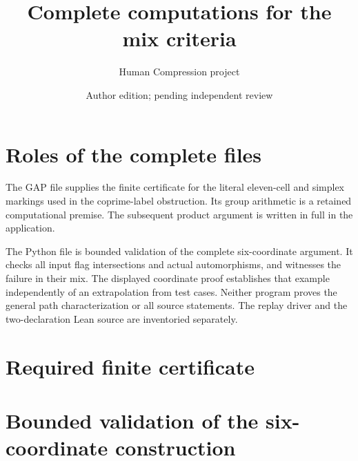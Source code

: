 \documentclass[a4paper,11pt]{article}
\title{Complete computations for the mix criteria}
\author{Human Compression project}\date{Author edition; pending independent review}
\begin{document}
\maketitle
\section*{Roles of the complete files}
The GAP file supplies the finite certificate for the literal eleven-cell and
simplex markings used in the coprime-label obstruction. Its group arithmetic is
a retained computational premise. The subsequent product argument is written
in full in the application.

The Python file is bounded validation of the complete six-coordinate argument.
It checks all input flag intersections and actual automorphisms, and witnesses
the failure in their mix. The displayed coordinate proof establishes that
example independently of an extrapolation from test cases. Neither program
proves the general path characterization or all source statements. The replay
driver and the two-declaration Lean source are inventoried separately.

\section*{Required finite certificate}
\section*{Bounded validation of the six-coordinate construction}
\end{document}
